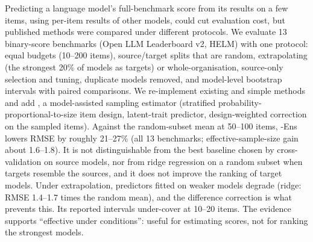 Predicting a language model's full-benchmark score from its results on a few items, using per-item results of other models, could cut evaluation cost, but published methods were compared under different protocols.
We evaluate 13 binary-score benchmarks (Open LLM Leaderboard v2, HELM) with one protocol: equal budgets (10--200 items), source/target splits that are random, extrapolating (the strongest 20\% of models as targets) or whole-organisation, source-only selection and tuning, duplicate models removed, and model-level bootstrap intervals with paired comparisons.
We re-implement existing and simple methods and add \mass{}, a model-assisted sampling estimator (stratified probability-proportional-to-size item design, latent-trait predictor, design-weighted correction on the sampled items).
Against the random-subset mean at 50--100 items, \mass{}-Ens lowers RMSE by roughly 21--27\% (all 13 benchmarks; effective-sample-size gain about 1.6--1.8). It is not distinguishable from the best baseline chosen by cross-validation on source models, nor from ridge regression on a random subset when targets resemble the sources, and it does not improve the ranking of target models. Under extrapolation, predictors fitted on weaker models degrade (ridge: RMSE 1.4--1.7 times the random mean), and the difference correction is what prevents this. Its reported intervals under-cover at 10--20 items.
The evidence supports ``effective under conditions'': useful for estimating scores, not for ranking the strongest models.
